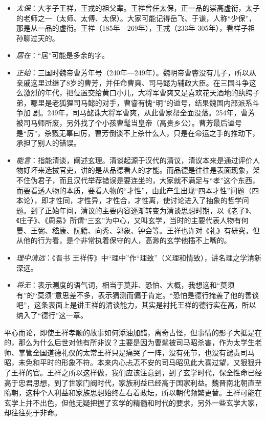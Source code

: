 \documentclass[]{book}
\providecommand{\tightlist}{%
  \setlength{\itemsep}{0pt}\setlength{\parskip}{0pt}}
\begin{document}
\begin{itemize}
\tightlist
\item
  \emph{太保}：大孝子王祥，王戎的祖父辈。王祥曾任太保，正一品的崇高虚衔，太子的老师之一（太师、太傅、太保）。大家可能记得岳飞、于谦，人称``少保''，那是从一品的虚衔。王祥（185年---269年），王戎（233年-305年），看样子祖孙聊过天的。
\item
  \emph{居在}：``居''可能是多余的字。
\item
  \emph{正始}：三国时魏帝曹芳年号（240年---249年）。魏明帝曹睿没有儿子，所以从亲戚这里过继了8岁的曹芳，并任命曹爽、司马懿为辅政大臣。在三国斗争这
  么激烈的年代，把位置交给黄口小儿，大将军曹爽又是喜欢花天酒地的纨绔子弟，哪里是老狐狸司马懿的对手，曹睿有愧``明''的谥号，结果魏国内部派系斗争加
  剧。249年，司马懿诛大将军曹爽，从此曹家帮全面没落。254年，曹芳被司马师所废，另外找了个小孩曹髦当皇帝（高贵乡公）。曹芳最后谥号是``厉''，杀戮无辜曰厉，曹芳倒谈不上杀什么人，只是在命运之手的推动下，承担了别人的错误。
\item
  \emph{能言}：指能清谈，阐述玄理。清谈起源于汉代的清议，清议本来是通过评价人物好坏来选拔官吏，讲的是从品德看人的才能。而品德是往往是表面现象，架不住伪君子，而且汉代举荐错误是要连坐的，大家就不满足与``孝''这个东西，而要看透人物的本质，要看人物的``才性''，由此产生出现``四本才性''问题（四本论），即才性同，才性异，才性合，才性离，使讨论进入了抽象的哲学问题。到了正始年间，清议的主要内容逐渐转变为清谈思想时期，以《老子》、《庄子》、《周易》所谓``三玄''为中心，又叫玄学，当时的主要代表人物有何晏、王弼、嵇康、阮籍、向秀、郭象、钟会等。王祥也许对《礼》有研究，但从他的行为看，是个非常执着保守的人，高渺的玄学他插不上嘴的。
\item
  \emph{理中清远}：《晋书
  王祥传》中``理中''作``理致''（义理和情致），讲名理之学清新深远。
\item
  \emph{将无}：表示测度的语气词，相当于莫非、恐怕、大概，我想这和``莫须有''的``莫须''意思差不多，表示猜测而偏于肯定。``恐怕是德行掩盖了他的善谈吧''，这条表面上是讲王祥的清谈能力，其实是衬托王祥的德行实在高，所以纳入了``德行''这一章。
\end{itemize}

平心而论，即使王祥孝顺的故事如何添油加醋，离奇古怪，但事情的影子大抵是在的，那么为什么后世对他有所非议？主要是因为曹髦被司马昭杀害，作为太学生老师、掌管全国道德礼仪的太常王祥只是痛哭了一阵，没有死节，也没有谴责司马昭，未免和平时的形象不符。本来内心忐忑不安的司马昭见此大喜过望，又狠狠升了王祥的官。王祥之所以这样做，我们应该注意到，到了玄学时代，保全性命已经高于忠君思想，到了世家门阀时代，家族利益已经高于国家利益。魏晋南北朝直至隋朝，这种个人利益和家族思想始终左右着政坛，所以朝代频繁更替。王祥可能在玄学上并不出色，但他无疑把握了玄学的精髓和时代的要求，另外一些玄学大家，
却往往死于非命。
\end{document}
